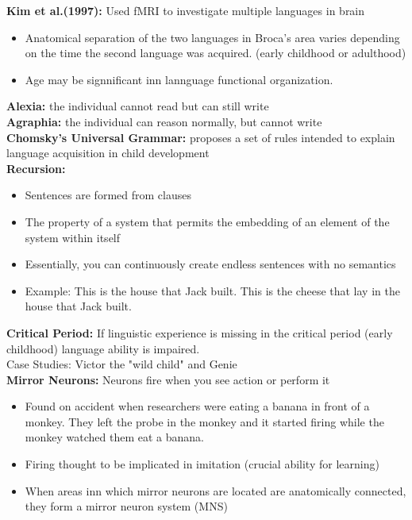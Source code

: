 \documentclass{article}
\begin{document}
\noindent \textbf{Kim et al.(1997):} Used fMRI to investigate multiple languages in brain 
\begin{itemize}
    \item Anatomical separation of the two languages in Broca's area varies depending on the time the second language was acquired. (early childhood or adulthood)
    \item Age may be signnificant inn lannguage functional organization. 
\end{itemize}

\noindent \textbf{Alexia:} the individual cannot read but can still write \\
\textbf{Agraphia:} the individual can reason normally, but cannot write \\
 
\noindent \textbf{Chomsky's Universal Grammar:} proposes a set of rules intended to explain language acquisition in child development \\

\noindent \textbf{Recursion:} 
\begin{itemize}
    \item Sentences are formed from clauses 
    \item The property of a system that permits the embedding of an element of the system within itself 
    \item Essentially, you can continuously create endless sentences with no semantics
    \item Example:
        \subitem This is the house that Jack built.
        \subitem This is the cheese that lay in the house that Jack built.
\end{itemize}

\noindent \textbf{Critical Period:} If linguistic experience is missing in the critical period (early childhood) language ability is impaired. \\
Case Studies: Victor the "wild child" and Genie \\

\noindent \textbf{Mirror Neurons:} Neurons fire when you see action or perform it
\begin{itemize}
    \item Found on accident when researchers were eating a banana in front of a monkey. They left the probe in the monkey and it started firing while the monkey watched them eat a banana. 
    \item Firing thought to be implicated in imitation (crucial ability for learning) 
    \item When areas inn which mirror neurons are located are anatomically connected, they form a mirror neuron system (MNS)
\end{itemize}
\end{document}
